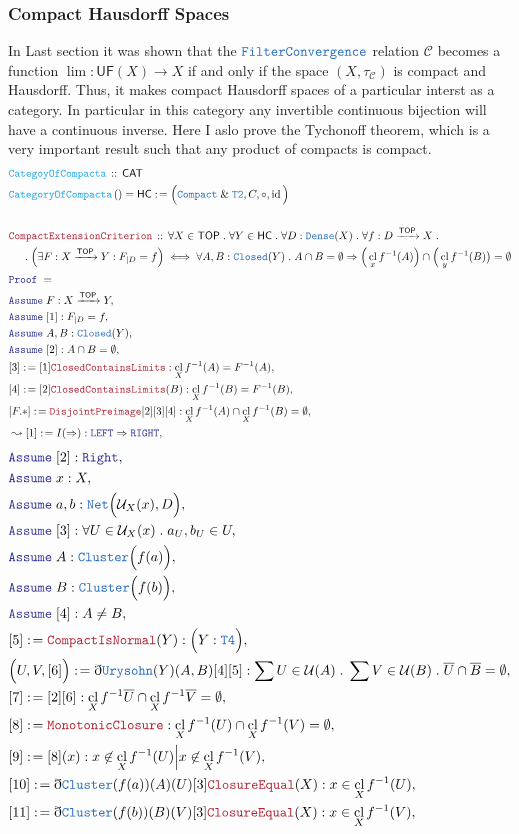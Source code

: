 \documentclass[12pt]{scrartcl}
\newcommand{\TYPE}[1]{\textcolor{NavyBlue}{\mathtt{#1}}}
\newcommand{\FUNC}[1]{\textcolor{Cerulean}{\mathtt{#1}}}
\newcommand{\LOGIC}[1]{\textcolor{Blue}{\mathtt{#1}}}
\newcommand{\THM}[1]{\textcolor{Maroon}{\mathtt{#1}}}
\renewcommand{\.}{\; . \;}
\newcommand{\de}{: \kern 0.1pc =}
\newcommand{\Act}[1]{\left( #1 \right)}
\newcommand{\Theorem}[2]{& \THM{#1} \, :: \, #2 \\ & \Proof = \\ }
\newcommand{\DeclareFunc}[2]{& \FUNC{#1} \, :: \, #2 \\}
\newcommand{\DefineNamedFunc}[4]{&  \FUNC{#1}\Act{#2} = #3 \de #4 \\}
\newcommand{\NewLine}{\\ & \kern 1pc}
\newcommand{\Page}[1]{ \begin{align*} #1 \end{align*}   }
\newcommand{ \bd }{ \ByDef }
\renewcommand{\And}{\; \& \;}
\newcommand{\Imply}{\Rightarrow}
\DeclareMathOperator*{\id}{id}
\newcommand{\Arrow}{\xrightarrow}
\newcommand{\Say}[3]{& #1 \de #2 : #3, \\}
\newcommand{\Derive}[3]{& \leadsto #1 \de #2 : #3, \\}
\newcommand{\Assume}[2]{& \LOGIC{Assume} \; #1 : #2, \\}
\newcommand{\ByDef}{\eth}
\newcommand{\Proof}{\LOGIC{Proof} \; }
\newcommand{\C}{\mathcal{C}}
\newcommand{\CAT}{\mathsf{CAT}}
\DeclareMathOperator*{\cl}{cl}
\newcommand{\TOP}{\mathsf{TOP}}
\newcommand{\HC}{\mathsf{HC}}
\newcommand{\U}{\mathcal{U}}
\begin{document}
\subsubsection{Compact Hausdorff Spaces}
In Last section it was shown that the $\TYPE{FilterConvergence}$ relation $\C$
becomes a function $\lim:\mathsf{UF}(X) \to X$ if and only if
the space $(X,\tau_\C)$ is compact and Hausdorff.  
Thus, it makes compact Hausdorff spaces of a particular interst as a category.
In particular in this category any invertible continuous bijection will have a 
continuous inverse.
Here I aslo prove the Tychonoff theorem, which is a very important result
such that any product of compacts is compact.
\Page{
	\DeclareFunc{CategoyOfCompacta}{\CAT}
	\DefineNamedFunc{CategoryOfCompacta}{}{\HC}{ \Big( \TYPE{Compact} \And \TYPE{T2}, C, \circ, \id \Big)  } 
	\\
	\Theorem{CompactExtensionCriterion}
	{
		\forall X \in \TOP \.
		\forall Y \in \HC \. 
		\forall D : \TYPE{Dense}(X) \.
		\forall f : D \Arrow{\TOP} X \.
		\NewLine \. 
		\Big(\exists F : X \Arrow{\TOP} Y  : F_{|D} = f \Big)    
		\iff
		\forall A,B : \TYPE{Closed}(Y) \.  
		A \cap B= \emptyset \Imply
		\Big(\cl_x f^{-1}(A)\Big) \cap \Big( \cl_y f^{-1}(B) \big) = \emptyset 
	}
	\Assume{F}{X \Arrow{\TOP} Y}
	\Assume{[1]}{F_{|D} = f }
	\Assume{A,B}{\TYPE{Closed}(Y)}
	\Assume{[2]}{A \cap B = \emptyset}
	\Say{[3]}{[1]\THM{ClosedContainsLimits}}{\cl_X f^{-1}(A) = F^{-1}(A) }
	\Say{[4]}{[2]\THM{ClosedContainsLimits}(B)}{\cl_X f^{-1}(B) = F^{-1}(B)}
	\Say{[F.*]}{\THM{DisjointPreimage}[2][3][4]}{ \cl_X f^{-1}(A) \cap \cl_X f^{-1}(B) = \emptyset }
	\Derive{[1]}{I(\Imply)}{\LOGIC{LEFT} \Imply \LOGIC{RIGHT}}
}\Page{
	\Assume{[2]}{\LOGIC{Right}}
	\Assume{x}{X}
	\Assume{a,b}{\TYPE{Net}\Big(\U_X(x),D\Big)}
	\Assume{[3]}{\forall  U \in \U_X(x) \.  a_U,b_U \in U}
	\Assume{A}{\TYPE{Cluster}\Big(f(a)\Big)}
	\Assume{B}{\TYPE{Cluster}\Big( f(b)\Big)}
	\Assume{[4]}{A \neq B}
	\Say{[5]}{\THM{CompactIsNormal}(Y)}{\Big( Y : \TYPE{T4}\Big)}
	\Say{\Big( U,V, [6] \Big)}
	{
		\bd \TYPE{Urysohn}(Y)(A,B)[4][5] 
	}
	{
		\sum U \in \U(A) \. \sum V \in \U(B) \. 
		\overline{U} \cap \overline{B} = \emptyset 
	}
	\Say{[7]}{[2][6]}{\cl_X f^{-1}\overline{U} \cap \cl_X f^{-1}\overline{V} = \emptyset}
	\Say{[8]}{\THM{MonotonicClosure}}{\cl_X f^{-1}(U) \cap \cl_X f^{-1}(V) = \emptyset}
	\Say{[9]}{[8](x)}{x \not \in \cl_X f^{-1}(U) \Big| x \not \in \cl_X f^{-1}(V) }
	\Say{[10]}{\bd \TYPE{Cluster}(f(a))(A)(U)[3]\THM{ClosureEqual}(X)}{x \in \cl_X f^{-1}(U)}
	\Say{[11]}{\bd \TYPE{Cluster}(f(b))(B)(V)[3]\THM{ClosureEqual}(X)}{x \in \cl_X f^{-1}(V)}
}
\end{document}
